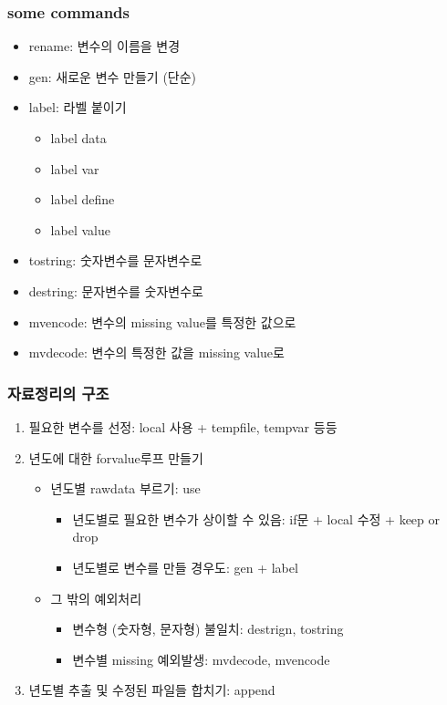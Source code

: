 \documentclass[aspectratio=169,xcolor=dvipsnames,handout]{beamer}
\begin{document}
\begin{frame}
    \frametitle{some commands}
    \begin{itemize}[<+->]
        \item rename: 변수의 이름을 변경
        \item gen: 새로운 변수 만들기 (단순)
        \item label: 라벨 붙이기
            \begin{itemize}[<+->]
                \item label data 
                \item label var
                \item label define 
                \item label value
            \end{itemize}
    \framebreak%
        \item tostring: 숫자변수를 문자변수로
        \item destring: 문자변수를 숫자변수로 
        \item mvencode: 변수의 missing value를 특정한 값으로
        \item mvdecode: 변수의 특정한 값을 missing value로 
    \end{itemize}
 \end{frame}

\begin{frame}
    \frametitle{자료정리의 구조}
    \begin{enumerate}[<+->]
        \item 필요한 변수를 선정: local 사용 + tempfile, tempvar 등등
        \item 년도에 대한 forvalue루프 만들기
            \begin{itemize}[<+->]
                \item 년도별 rawdata 부르기: use
                \begin{itemize}[<+->]
                    \item 년도별로 필요한 변수가 상이할 수 있음: if문 + local 수정 + keep or drop
                    \item 년도별로 변수를 만들 경우도: gen + label
                \end{itemize}
                \item 그 밖의 예외처리
                \begin{itemize}[<+->]
                    \item 변수형 (숫자형, 문자형) 불일치: destrign, tostring
                    \item 변수별 missing 예외발생: mvdecode, mvencode
                \end{itemize}
            \end{itemize}
        \item  년도별 추출 및 수정된 파일들 합치기: append
    \end{enumerate}
\end{frame}

\end{document}

